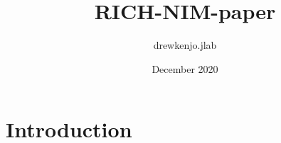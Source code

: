 \documentclass{article}
\title{RICH-NIM-paper}
\author{drewkenjo.jlab }
\date{December 2020}
\begin{document}
\maketitle

\section{Introduction}
\end{document}
